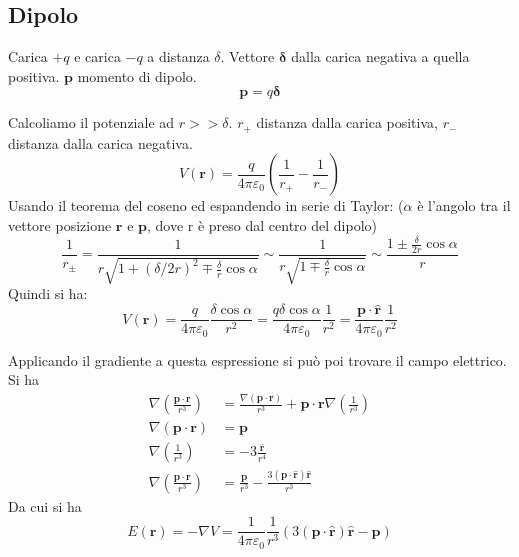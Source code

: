 \documentclass{article}
\renewcommand{\epsilon}{\varepsilon}
\newcommand{\mbf}{\mathbf}
\newcommand{\vers}[1]{\mbf{\hat #1 }}
\newcommand{\qpe}[1][1]{ \frac{ #1 }{ 4\pi\epsilon_0 } }
\numberwithin{equation}{section}
\begin{document}

\subsection{Dipolo} %
\label{sub:dipolo}

Carica $+q$ e carica $-q$ a distanza $\delta$. Vettore $\pmb \delta$ dalla carica negativa a quella positiva. $\mbf p$ momento di dipolo.
\begin{equation}
    \mbf p = q \pmb \delta
\end{equation}

Calcoliamo il potenziale ad $r >> \delta$. $r_+$ distanza dalla carica positiva, $r_-$ distanza dalla carica negativa. 
\begin{equation}
    V(\mbf r) = \qpe[q] \left ( \frac{ 1 }{ r_+ } - \frac{ 1 }{ r_- }  \right )
\end{equation}
Usando il teorema del coseno ed espandendo in serie di Taylor: ($\alpha$ è l'angolo tra il vettore posizione $\mbf r$ e $\mbf p$, dove r è preso dal centro del dipolo)
\begin{equation}
    \frac{ 1 }{ r_\pm } 
        = \frac{ 1 }{ r \sqrt{ 1 + (\delta/2r)^2 \mp \frac{\delta}{r} \cos \alpha} } 
        \sim \frac{ 1 }{ r \sqrt{ 1 \mp \frac{\delta}{r} \cos \alpha} } 
        \sim \frac{ 1 \pm \frac{\delta}{2r} \cos \alpha }{ r } 
\end{equation}
Quindi si ha:
\begin{equation} \label{eq:campo_dipolo} 
    V(\mbf r) 
        = \qpe[q] \frac{ \delta \cos \alpha }{ r^2 } 
        = \qpe[q \delta \cos \alpha] \frac{ 1 }{ r^2 } 
        = \qpe[\mbf p \cdot \vers r] \frac{ 1 }{ r^2 } 
\end{equation}

Applicando il gradiente a questa espressione si può poi trovare il campo elettrico. Si ha 
\begin{align*}
    \nabla \left ( \frac{ \mbf p \cdot \mbf r }{ r^3 } \right ) 
    &= \frac{ \nabla(\mbf p \cdot \mbf r) }{ r^3 } + \mbf p \cdot \mbf r \nabla \left ( \frac{ 1 }{ r^3 } \right ) \\
    \nabla (\mbf p \cdot \mbf r) &= \mbf p \\
    \nabla \left ( \frac{ 1 }{ r^3 } \right ) &= -3 \frac{ \vers r }{ r^4 } \\
    \nabla \left ( \frac{ \mbf p \cdot \mbf r }{ r^3 } \right )  &= \frac{ \mbf p }{ r^3 } - \frac{ 3 ( \mbf p \cdot \vers r) \vers r}{ r^3 }
\end{align*}
Da cui si ha 
\begin{equation}
    E(\mbf r) = -\nabla V = \qpe \frac{ 1 }{ r^3 } ( 3 ( \mbf p \cdot \vers r) \vers r  -  \mbf p )
\end{equation}
\end{document}
